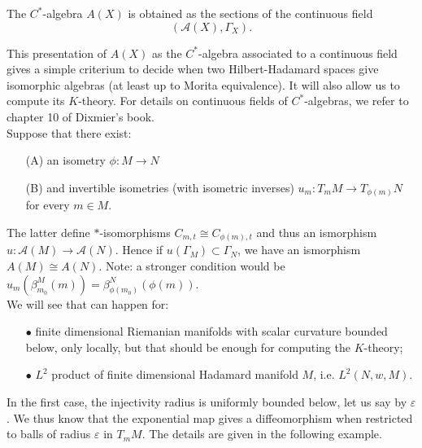 \begin{definition}
The $C^*$-algebra $A(X)$ is obtained as the sections of the continuous field 
\[(\mathcal A(X), \Gamma_X ).\]
\end{definition}

This presentation of $A(X)$ as the $C^*$-algebra associated to a continuous field gives a simple criterium to decide when two Hilbert-Hadamard spaces give isomorphic algebras (at least up to Morita equivalence). It will also allow us to compute its $K$-theory. For details on continuous fields of $C^*$-algebras, we refer to chapter 10 of Dixmier's book\cite{dixmier}.\\

Suppose that there exist: 
\begin{itemize}
\item[(A)] an isometry $\phi: M \rightarrow N$ 
\item[(B)] and invertible isometries (with isometric inverses) $u_m: T_m M \rightarrow T_{\phi(m)}N$ for every $m\in M$.
\end{itemize} 
The latter define $*$-isomorphisms $C_{m,t} \cong C_{\phi(m),t}$ and thus an ismorphism $u : \mathcal A(M)\rightarrow \mathcal A(N)$. Hence if $u(\Gamma_M)\subset \Gamma_N$, we have an ismorphism $A(M)\cong A(N)$. Note: a stronger condition would be  $u_m(\beta^M_{m_0}(m))= \beta^N_{\phi(m_0)}(\phi(m))$.\\ 

We will see that can happen for:
\begin{itemize}
\item[$\bullet$] finite dimensional Riemanian manifolds with scalar curvature bounded below, only locally, but that should be enough for computing the $K$-theory;
\item[$\bullet$] $L^2$ product of finite dimensional Hadamard manifold $M$, i.e. $L^2(N,w,M)$.
\end{itemize}

In the first case, the injectivity radius is uniformly bounded below, let us say by $\varepsilon$. We thus know that the exponential map gives a diffeomorphism when restricted to balls of radius $\varepsilon$ in $T_m M$. The details are given in the following example.\\ 

